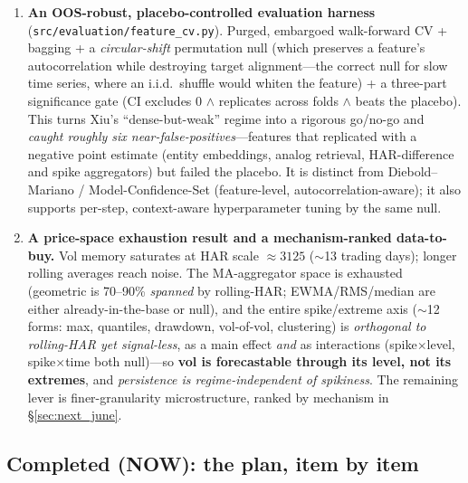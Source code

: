 \begin{enumerate}
\item \textbf{An OOS-robust, placebo-controlled evaluation harness}
(\texttt{src/evaluation/feature\_cv.py}). Purged, embargoed walk-forward CV +
bagging + a \emph{circular-shift} permutation null (which preserves a feature's
autocorrelation while destroying target alignment---the correct null for slow
time series, where an i.i.d.\ shuffle would whiten the feature) + a three-part
significance gate (CI excludes 0 $\wedge$ replicates across folds $\wedge$ beats
the placebo). This turns Xiu's ``dense-but-weak'' regime into a rigorous go/no-go
and \emph{caught roughly six near-false-positives}---features that replicated with
a negative point estimate (entity embeddings, analog retrieval, HAR-difference and
spike aggregators) but failed the placebo. It is distinct from Diebold--Mariano /
Model-Confidence-Set (feature-level, autocorrelation-aware); it also supports
per-step, context-aware hyperparameter tuning by the same null.

\item \textbf{A price-space exhaustion result and a mechanism-ranked
data-to-buy.} Vol memory saturates at HAR scale $\approx 3125$ ($\sim$13 trading
days); longer rolling averages reach noise. The MA-aggregator space is exhausted
(geometric is 70--90\% \emph{spanned} by rolling-HAR; EWMA/RMS/median are either
already-in-the-base or null), and the entire spike/extreme axis ($\sim$12 forms:
max, quantiles, drawdown, vol-of-vol, clustering) is \emph{orthogonal to
rolling-HAR yet signal-less}, as a main effect \emph{and} as interactions
(spike$\times$level, spike$\times$time both null)---so \textbf{vol is forecastable
through its level, not its extremes}, and \emph{persistence is regime-independent
of spikiness}. The remaining lever is finer-granularity microstructure, ranked by
mechanism in \S\ref{sec:next_june}.
\end{enumerate}

\subsection{Completed (NOW): the plan, item by item}
\label{sec:now_june}

